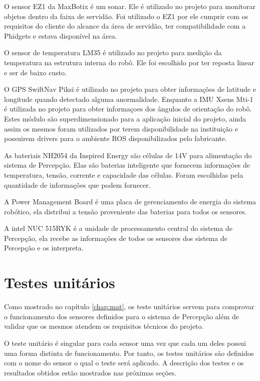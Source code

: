 O sensor EZ1 da MaxBotix é um sonar. Ele é utilizado no projeto para monitorar objetos dentro da faixa de servidão. Foi utilizado o EZ1 por ele cumprir com os requisitos do cliente do alcance da área de servidão, ter compatibilidade com a Phidgets e estava disponível na área.

O sensor de temperatura LM35 é utilizado no projeto para medição da temperatura na estrutura interna do robô. Ele foi escolhido por ter reposta linear e ser de baixo custo.



O GPS SwiftNav Piksi é utilizado no projeto para obter informações de latitude e longitude quando detectado alguma anormalidade. Enquanto a IMU Xsens Mti-1 é utilizada no projeto para obter informaçoes dos ângulos de orientação do robô. Estes módulo são superdimensionado para a aplicação inicial do projeto, ainda assim os mesmos foram utilizados por terem disponibilidade na instituição e possuirem drivers para o ambiente ROS disponibilizados pelo fabricante.



As bateriais NH2054 da Inspired Energy são células de 14V para alimentação do sistema de Percepção. Elas são baterias inteligente que fornecem informações de temperatura, tensão, corrente e capacidade das células. Foram escolhidas pela quantidade de informações que podem fornecer.



A Power Management Board é uma placa de gerenciamento de energia do sistema robótico, ela distribui a tensão proveniente das baterias para todos os sensores.



A intel NUC 515RYK é a unidade de processamento central do sistema de Percepção, ela recebe as informações de todos os sensores dos sistema de Percepção e os interpreta. 
\section{Testes unitários}
\label{sec:testu}

Como mostrado no capítulo \ref{chap:mat}, os teste unitários servem para comprovar o funcionamento dos sensores definidos para o sistema de Percepção além de validar que os mesmos atendem os requisitos técnicos do projeto.

O teste unitário é singular para cada sensor uma vez que cada um deles possui uma forma distinta de funcionamento. Por tanto, os testes unitários são definidos com o nome do sensor o qual o teste será aplicado. A descrição dos testes e os resultados obtidos estão mostrados nas próximas seções.


